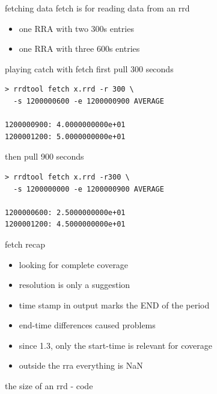 

\begin{frame}{fetching data}
fetch is for reading data from an rrd

\begin{itemize}[<+-| alert@+>]
\item one RRA with two 300s entries
\item one RRA with three 600s entries
\end{itemize}
\end{frame}

\begin{frame}[fragile]{playing catch with fetch}
first pull 300 seconds
\begin{verbatim}
> rrdtool fetch x.rrd -r 300 \
  -s 1200000600 -e 1200000900 AVERAGE

1200000900: 4.0000000000e+01
1200001200: 5.0000000000e+01
\end{verbatim}

then pull 900 seconds
\begin{verbatim}
> rrdtool fetch x.rrd -r300 \
  -s 1200000000 -e 1200000900 AVERAGE

1200000600: 2.5000000000e+01
1200001200: 4.5000000000e+01
\end{verbatim}
\end{frame}

\begin{frame}{fetch recap}
\begin{itemize}[<+-| alert@+>]
\item looking for complete coverage
\item resolution is only a suggestion
\item time stamp in output marks the END of the period
\item end-time differences caused problems
\item since 1.3, only the start-time is relevant for coverage
\item outside the rra everything is NaN
\end{itemize}
\end{frame}

\begin{frame}{the size of an rrd - code}

\end{frame}

